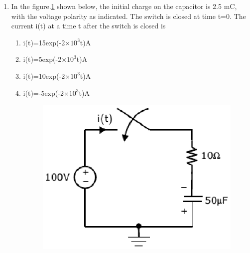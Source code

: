 \documentclass[journal,12pt,twocolumn]{IEEEtran}
\begin{document}
\begin{enumerate}
\item In the figure.\ref{fig83} shown below, the initial charge on the capacitor is 2.5 mC, with the
voltage polarity as indicated. The switch is closed at time t=0. The current i(t) at
a time t after the switch is closed is
\begin{enumerate}
\setlength\itemsep{2em}
\item i(t)=15exp(-2$\times10^{3}$t)A
\item i(t)=5exp(-2$\times10^{3}$t)A
\item i(t)=10exp(-2$\times10^{3}$t)A
\item i(t)=-5exp(-2$\times10^{3}$t)A
\begin{figure}[!h]
\begin{center}
\includegraphics[scale=0.7]{./figs/fig83.eps}
\caption{}
\label{fig83}
\end{center}
\end{figure}
\end{enumerate}



\end{enumerate}
\end{document}
